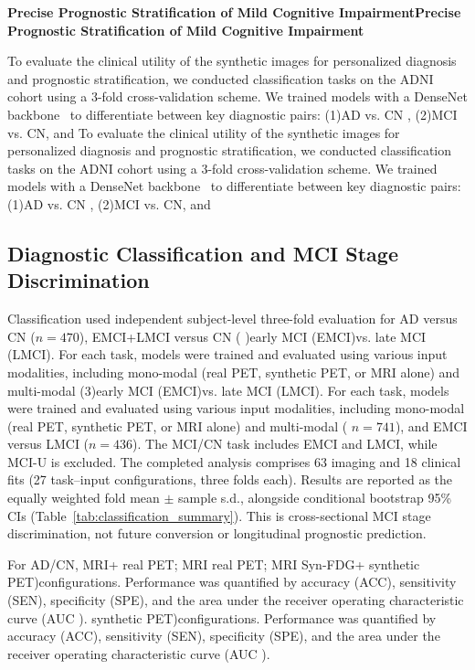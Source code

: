 \documentclass{article}
\providecommand{\DIFaddtex}[1]{{\protect\color{blue} \sf #1}} %
\providecommand{\DIFdeltex}[1]{{\protect\color{red} \ifmmode #1\else\scriptsize #1\fi}} %
\providecommand{\DIFaddbegin}{} %
\providecommand{\DIFaddend}{} %
\providecommand{\DIFdelbegin}{} %
\providecommand{\DIFdelend}{} %
\providecommand{\DIFadd}[1]{\texorpdfstring{\DIFaddtex{#1}}{#1}} %
\providecommand{\DIFdel}[1]{\texorpdfstring{\DIFdeltex{#1}}{}} %
\newcommand{\DIFscaledelfig}{0.5}
\newlength{\DIFdelgraphicswidth} %
\newlength{\DIFdelgraphicsheight} %
\newcommand{\DIFaddincludegraphics}[2][]{{\color{blue}\fbox{\DIFOincludegraphics[#1]{#2}}}} %
\newcommand{\DIFdelincludegraphics}[2][]{%
\sbox{\DIFdelgraphicsbox}{\DIFOincludegraphics[#1]{#2}}%
\settoboxwidth{\DIFdelgraphicswidth}{\DIFdelgraphicsbox} %
\settoboxtotalheight{\DIFdelgraphicsheight}{\DIFdelgraphicsbox} %
\scalebox{\DIFscaledelfig}{%
\parbox[b]{\DIFdelgraphicswidth}{\usebox{\DIFdelgraphicsbox}\\[-\baselineskip] \rule{\DIFdelgraphicswidth}{0em}}\llap{\resizebox{\DIFdelgraphicswidth}{\DIFdelgraphicsheight}{%
\setlength{\unitlength}{\DIFdelgraphicswidth}%
\begin{picture}(1,1)%
\thicklines\linethickness{2pt} %
{\color[rgb]{1,0,0}\put(0,0){\framebox(1,1){}}}%
{\color[rgb]{1,0,0}\put(0,0){\line( 1,1){1}}}%
{\color[rgb]{1,0,0}\put(0,1){\line(1,-1){1}}}%
\end{picture}%
}\hspace*{3pt}}} %
} %
\DeclareRobustCommand{\DIFaddbegin}{\DIFOaddbegin \let\includegraphics\DIFaddincludegraphics} %
\DeclareRobustCommand{\DIFaddend}{\DIFOaddend \let\includegraphics\DIFOincludegraphics} %
\DeclareRobustCommand{\DIFdelbegin}{\DIFOdelbegin \let\includegraphics\DIFdelincludegraphics} %
\DeclareRobustCommand{\DIFdelend}{\DIFOaddend \let\includegraphics\DIFOincludegraphics} %
\begin{document}
\DIFdelbegin \par\noindent\DIFdel{\textbf{Precise Prognostic Stratification of Mild Cognitive Impairment}}\par
\DIFdel{To evaluate the clinical utility of the synthetic images for personalized diagnosis and prognostic stratification, we conducted classification tasks on the ADNI cohort using a 3-fold cross-validation scheme. We trained models with a DenseNet backbone~\cite{huang2017densely} to differentiate between key diagnostic pairs: (1)AD vs. CN , (2)MCI vs. CN, and }\DIFdelend \DIFaddbegin \subsection{\texorpdfstring{\DIFadd{Diagnostic Classification and MCI Stage Discrimination}}{Diagnostic Classification and MCI Stage Discrimination}}
\DIFadd{Classification used independent subject-level three-fold evaluation for AD versus CN ($n=470$), EMCI+LMCI versus CN }\DIFaddend (\DIFdelbegin \DIFdel{3)early MCI (EMCI)vs. late MCI (LMCI).
For each task, models were trained and evaluated using various input modalities, including mono-modal (real PET, synthetic PET, or MRI alone) and multi-modal (}\DIFdelend \DIFaddbegin \DIFadd{$n=741$), and EMCI versus LMCI ($n=436$). The MCI/CN task includes EMCI and LMCI, while MCI-U is excluded. The completed analysis comprises 63 imaging and 18 clinical fits (27 task--input configurations, three folds each). Results are reported as the equally weighted fold mean $\pm$ sample s.d., alongside conditional bootstrap 95\% CIs (Table~\ref{tab:classification_summary}). This is cross-sectional MCI stage discrimination, not future conversion or longitudinal prognostic prediction.
}

\DIFadd{For AD/CN, }\DIFaddend MRI+\DIFdelbegin \DIFdel{real PET; MRI }\DIFdelend \DIFaddbegin \DIFadd{Syn-FDG}\DIFaddend +\DIFdelbegin \DIFdel{synthetic PET)configurations. Performance was quantified by accuracy (ACC), sensitivity (SEN), specificity (SPE), and the area under the receiver operating characteristic curve (AUC ).
}%
\end{document}
